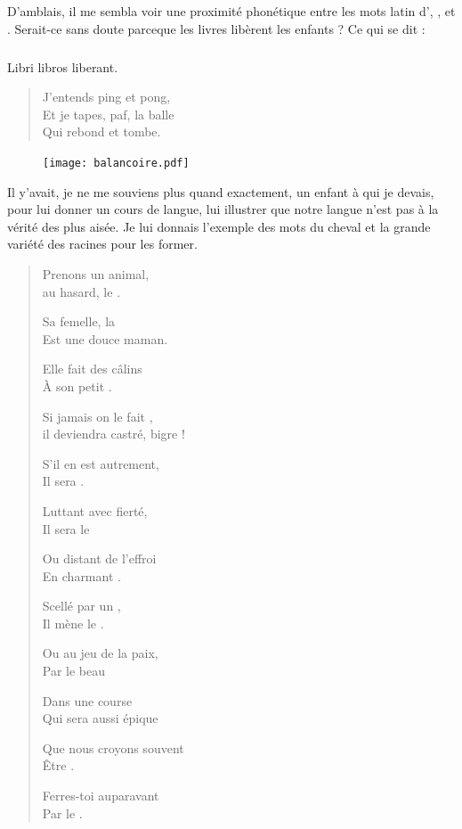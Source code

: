 \begin{prose}
D’amblais, il me sembla voir une proximité phonétique entre les mots latin d’, , et . Serait-ce sans doute parceque les livres libèrent les enfants ? Ce qui se dit :
\end{prose}

\subparagraph{}
Libri libros liberant.

\begin{verse}
J’entends ping et pong,\\
Et je tapes, paf, la balle\\
Qui rebond et tombe.
\end{verse}

\begin{figure}[h]
\centering
\texttt{[image: balancoire.pdf]}
\captionsetup{labelformat=empty}
\caption[Idéotexte de ]{}
\end{figure}

\begin{prose}
Il y’avait, je ne me souviens plus quand exactement, un enfant à qui je devais, pour lui donner un cours de langue, lui illustrer que notre langue n’est pas à la vérité des plus aisée. Je lui donnais l’exemple des mots du cheval et la grande variété des racines pour les former.
\end{prose}


\begin{verse}
Prenons un animal,\\
au hasard, le .

Sa femelle, la \\
Est une douce maman.

Elle fait des câlins\\
À son petit .

Si jamais on le fait ,\\
il deviendra castré, bigre !

S’il en est autrement,\\
Il sera .

Luttant avec fierté,\\
Il sera le 

Ou distant de l’effroi\\
En charmant .

Scellé par un ,\\
Il mène le .

Ou au jeu de la paix,\\
Par le beau 

Dans une course \\
Qui sera aussi épique

Que nous croyons souvent\\
Être .

Ferres-toi auparavant\\
Par le .
\end{verse}



